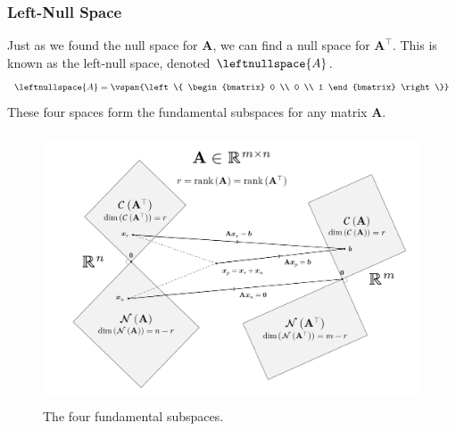 \documentclass{article}
\begin{document}
\subsubsection{Left-Null Space}
Just as we found the null space for \(\symbf{A}\), we can find a null space for \(\symbf{A}^\top\).
This is known as the left-null space, denoted \(\leftnullspace{A}\).
\begin{equation*}
    \leftnullspace{A} =
    \vspan{\left\{
        \begin{bmatrix}
            0 \\
            0 \\
            1
        \end{bmatrix}
        \right\}}
\end{equation*}
These four spaces form the fundamental subspaces for any matrix \(\symbf{A}\).
\begin{figure}[H]
    \centering
    \includegraphics[height = 8cm, keepaspectratio = true]{figures/fundamental_subspaces.pdf}
    \caption{The four fundamental subspaces.} %
\end{figure}
\end{document}
